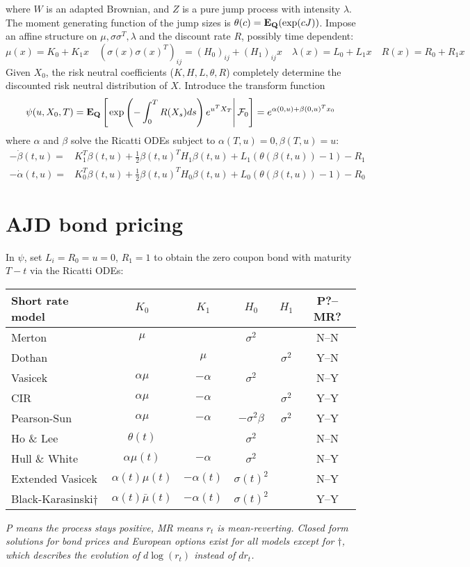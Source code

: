 \documentclass[twocolumn]{amsart}
\begin{document}
where $W$ is an adapted Brownian, and $Z$ is a pure jump process with intensity $\lambda$. The moment generating function of the jump sizes is $\theta(c)=\mathbf{E}_\mathbf{Q}(\exp(cJ))$. Impose an affine structure on $\mu,\sigma\sigma^T,\lambda$ and the discount rate $R$, possibly time dependent:
\begin{equation*}
\mu(x)=K_0+K_1x \quad (\sigma(x)\sigma(x)^T)_{ij}=(H_0)_{ij}+(H_1)_{ij}x
\quad \lambda(x)=L_0+L_1x \quad R(x)=R_0+R_1x
\end{equation*}
Given $X_0$, the risk neutral coefficients ($K,H,L,\theta,R$) completely determine the discounted risk neutral distribution of $X$. Introduce the transform function
\begin{equation*}
\psi(u,X_0,T)=\mathbf{E}_\mathbf{Q}\left[\left.\exp\left(-\int_0^{T}R(X_s)ds\right)e^{u^TX_T}\right|\mathcal{F}_0\right]=e^{\alpha(0,u)+\beta(0,u)^Tx_0}
\end{equation*}
where $\alpha$ and $\beta$ solve the Ricatti ODEs subject to $\alpha(T,u)=0,\beta(T,u)=u$:
\begin{align*}
-\dot{\beta}(t,u)=&K_1^T\beta(t,u)+\tfrac{1}{2}\beta(t,u)^TH_1\beta(t,u)+L_1(\theta(\beta(t,u))-1)-R_1\\
-\dot{\alpha}(t,u)=&K_0^T\beta(t,u)+\tfrac{1}{2}\beta(t,u)^TH_0\beta(t,u)+L_0(\theta(\beta(t,u))-1)-R_0
\end{align*}

\section*{AJD bond pricing} In $\psi$, set $L_i=R_0=u=0$, $R_1=1$ to obtain the zero coupon bond with maturity $T-t$ via the Ricatti ODEs:
\begin{center}
\begin{tabular}{|lccccc|}
\hline
Short rate model 	&$K_0$	&$K_1$	&$H_0$	&$H_1$	& P?--MR? \\
\hline
Merton	&$\mu$ 	& 	  	&$\sigma^2$&  	& N--N \\
Dothan  & 		& $\mu$ & 		&$\sigma^2$ & Y--N \\
Vasicek & $\alpha\mu$ &$-\alpha$ & $\sigma^2$&  & N--Y \\
CIR  	& $\alpha\mu$ &$-\alpha$ &  & $\sigma^2$& Y--Y \\
Pearson-Sun & $\alpha\mu$ & $-\alpha$ & $-\sigma^2\beta$&$\sigma^2 $ & Y--Y \\
Ho \& Lee &  $\theta(t)$ & & $\sigma^2$&  & N--N \\
Hull \& White & $\alpha\mu(t)$ & $-\alpha$ &  $\sigma^2$ & & N--Y \\
Extended Vasicek & $\alpha(t)\mu(t)$ &  $-\alpha(t)$ & $\sigma(t)^2$ & & N--Y\\
Black-Karasinski$\dagger$ & $\alpha(t)\bar{\mu}(t)$ & $-\alpha(t)$ & $\sigma(t)^2 $ & & Y--Y\\
\hline
\end{tabular}
\end{center}
\emph{P means the process stays positive, MR means $r_t$ is mean-reverting. Closed form solutions for bond prices and European options exist for all models except for $\dagger$, which describes the evolution of $d\log(r_t)$ instead of $dr_t$.}
\end{document}
